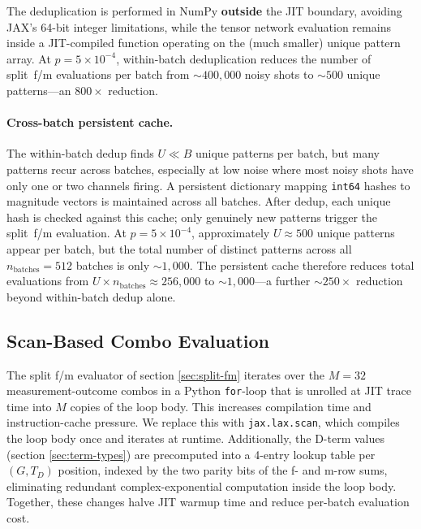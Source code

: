 \documentclass[a4paper,onecolumn,11pt,accepted=2026-06-10]{quantumarticle}
\begin{document}
The deduplication is performed in NumPy \textbf{outside} the JIT boundary, avoiding JAX's 64-bit integer limitations, while the tensor network evaluation remains inside a JIT-compiled function operating on the (much smaller) unique pattern array. At $p = 5 \times 10^{-4}$, within-batch deduplication reduces the number of split~f/m evaluations per batch from ${\sim}400{,}000$ noisy shots to ${\sim}500$ unique patterns---an $800\times$ reduction.

\paragraph{Cross-batch persistent cache.} The within-batch dedup finds $U \ll B$ unique patterns per batch, but many patterns recur across batches, especially at low noise where most noisy shots have only one or two channels firing. A persistent dictionary mapping \texttt{int64} hashes to magnitude vectors is maintained across all batches. After dedup, each unique hash is checked against this cache; only genuinely new patterns trigger the split~f/m evaluation. At $p = 5 \times 10^{-4}$, approximately $U \approx 500$ unique patterns appear per batch, but the total number of distinct patterns across all $n_{\mathrm{batches}} = 512$ batches is only ${\sim}1{,}000$. The persistent cache therefore reduces total evaluations from $U \times n_{\mathrm{batches}} \approx 256{,}000$ to ${\sim}1{,}000$---a further ${\sim}250\times$ reduction beyond within-batch dedup alone.

\subsection{Scan-Based Combo Evaluation}
\label{sec:scan-combo}

The split f/m evaluator of section \ref{sec:split-fm} iterates over the $M = 32$ measurement-outcome combos in a Python \texttt{for}-loop that is unrolled at JIT trace time into $M$ copies of the loop body. This increases compilation time and instruction-cache pressure. We replace this with \texttt{jax.lax.scan}, which compiles the loop body once and iterates at runtime. Additionally, the D-term values (section \ref{sec:term-types}) are precomputed into a 4-entry lookup table per $(G, T_D)$ position, indexed by the two parity bits of the f- and m-row sums, eliminating redundant complex-exponential computation inside the loop body. Together, these changes halve JIT warmup time and reduce per-batch evaluation cost.
\end{document}
